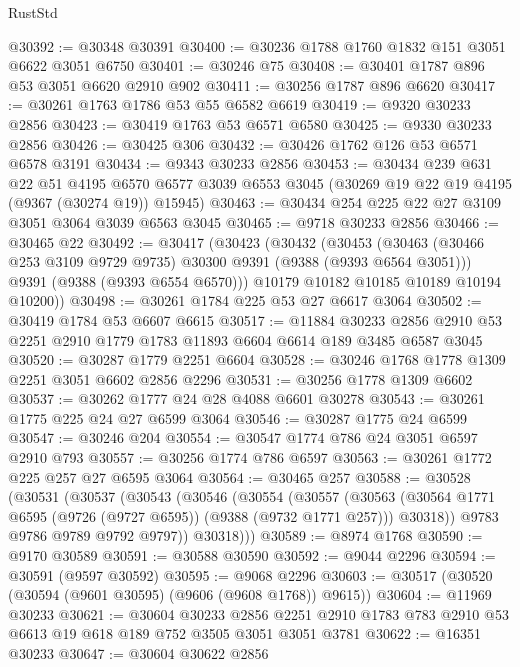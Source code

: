 \begin{lexlean}{RustStd}
\begin{coremodule}
@30392 := @30348 @30391
@30400 := @30236 @1788 @1760 @1832 @151 @3051 @6622 @3051 @6750
@30401 := @30246 @75
@30408 := @30401 @1787 @896 @53 @3051 @6620 @2910 @902
@30411 := @30256 @1787 @896 @6620
@30417 := @30261 @1763 @1786 @53 @55 @6582 @6619
@30419 := @9320 @30233 @2856
@30423 := @30419 @1763 @53 @6571 @6580
@30425 := @9330 @30233 @2856
@30426 := @30425 @306
@30432 := @30426 @1762 @126 @53 @6571 @6578 @3191
@30434 := @9343 @30233 @2856
@30453 := @30434
    @239
    @631
    @22
    @51
    @4195
    @6570
    @6577
    @3039
    @6553
    @3045
    (@30269 @19 @22 @19 @4195 (@9367 (@30274 @19)) @15945)
@30463 := @30434 @254 @225 @22 @27 @3109 @3051 @3064 @3039 @6563 @3045
@30465 := @9718 @30233 @2856
@30466 := @30465 @22
@30492 := @30417
    (@30423
      (@30432
        (@30453
          (@30463 (@30466 @253 @3109 @9729 @9735) @30300 @9391 (@9388 (@9393 @6564 @3051)))
          @9391
          (@9388 (@9393 @6554 @6570)))
        @10179
        @10182
        @10185
        @10189
        @10194
        @10200))
@30498 := @30261 @1784 @225 @53 @27 @6617 @3064
@30502 := @30419 @1784 @53 @6607 @6615
@30517 := @11884
    @30233
    @2856
    @2910
    @53
    @2251
    @2910
    @1779
    @1783
    @11893
    @6604
    @6614
    @189
    @3485
    @6587
    @3045
@30520 := @30287 @1779 @2251 @6604
@30528 := @30246 @1768 @1778 @1309 @2251 @3051 @6602 @2856 @2296
@30531 := @30256 @1778 @1309 @6602
@30537 := @30262 @1777 @24 @28 @4088 @6601 @30278
@30543 := @30261 @1775 @225 @24 @27 @6599 @3064
@30546 := @30287 @1775 @24 @6599
@30547 := @30246 @204
@30554 := @30547 @1774 @786 @24 @3051 @6597 @2910 @793
@30557 := @30256 @1774 @786 @6597
@30563 := @30261 @1772 @225 @257 @27 @6595 @3064
@30564 := @30465 @257
@30588 := @30528
    (@30531
      (@30537
        (@30543
          (@30546
            (@30554
              (@30557
                (@30563
                  (@30564 @1771 @6595 (@9726 (@9727 @6595)) (@9388 (@9732 @1771 @257)))
                  @30318))
              @9783
              @9786
              @9789
              @9792
              @9797))
          @30318)))
@30589 := @8974 @1768
@30590 := @9170 @30589
@30591 := @30588 @30590
@30592 := @9044 @2296
@30594 := @30591 (@9597 @30592)
@30595 := @9068 @2296
@30603 := @30517 (@30520 (@30594 (@9601 @30595) (@9606 (@9608 @1768)) @9615))
@30604 := @11969 @30233
@30621 := @30604
    @30233
    @2856
    @2251
    @2910
    @1783
    @783
    @2910
    @53
    @6613
    @19
    @618
    @189
    @752
    @3505
    @3051
    @3051
    @3781
@30622 := @16351 @30233
@30647 := @30604
    @30622
    @2856

\end{coremodule}
\end{lexlean}
